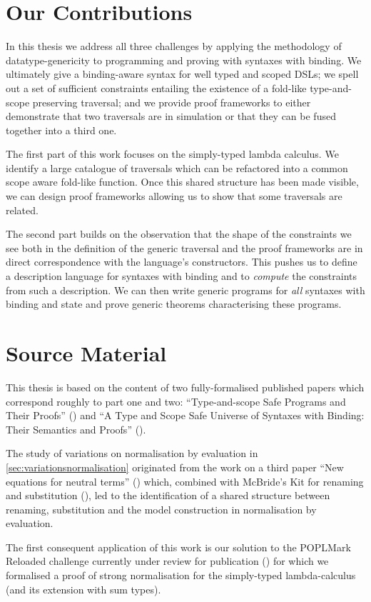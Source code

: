 \section{Our Contributions}

In this thesis we address all three challenges by applying the methodology of
datatype-genericity to programming and proving with syntaxes with binding.
We ultimately give a binding-aware syntax for well typed and scoped DSLs; we
spell out a set of sufficient constraints entailing the existence of a fold-like
type-and-scope preserving traversal; and we provide proof frameworks
to either demonstrate that two traversals are in simulation or that they can be
fused together into a third one.

The first part of this work focuses on the simply-typed lambda calculus. We
identify a large catalogue of traversals which can be refactored into a common
scope aware fold-like function. Once this shared structure has been made
visible, we can design proof frameworks allowing us to show that some traversals
are related.

The second part builds on the observation that the shape of the constraints we
see both in the definition of the generic traversal and the proof frameworks
are in direct correspondence with the language's constructors. This pushes us
to define a description language for syntaxes with binding and to \emph{compute}
the constraints from such a description. We can then write generic programs for
\emph{all} syntaxes with binding and state and prove generic theorems characterising
these programs.

\section{Source Material}

This thesis is based on the content of two fully-formalised published papers which correspond
roughly to part one and two: ``Type-and-scope Safe Programs and Their Proofs''
(\cite{allais2017type, repo2017}) and
``A Type and Scope Safe Universe of Syntaxes with Binding: Their Semantics and Proofs''
(\cite{generic-syntax, repo2018}).

The study of variations on normalisation by evaluation in \cref{sec:variationsnormalisation}
originated from the work on a third paper ``New equations for neutral terms''
(\cite{new-equations}) which, combined with McBride's Kit for renaming and substitution
(\citeyear{mcbride2005type}), led to the identification of a shared structure between renaming,
substitution and the model construction in normalisation by evaluation.

The first consequent application of this work is our solution to the
POPLMark Reloaded challenge currently under review for publication
(\cite{poplmarkreloaded, poplmark2}) for which we formalised a proof of
strong normalisation for the simply-typed lambda-calculus (and its extension
with sum types).
